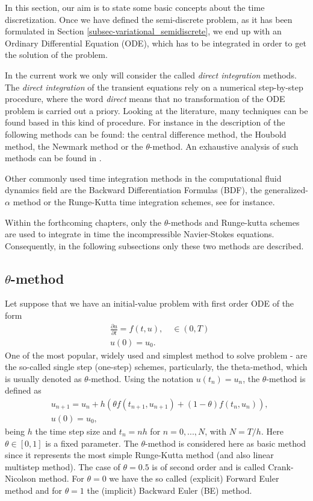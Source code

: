 In this section, our aim is to state some basic concepts about the time discretization. Once we have defined the semi-discrete problem, as it has been formulated in Section \ref{subsec-variational_semidiscrete}, we end up with an Ordinary Differential Equation (ODE), which has to be integrated in order to get the solution of the problem.

In the current work we only will consider the called \textit{direct integration} methods. The \textit{direct integration} of the transient equations rely on a numerical step-by-step procedure, where the word \textit{direct} means that no transformation of the ODE problem is carried out a priory. Looking at the literature, many techniques can be found based in this kind of procedure. For instance in \cite{bathe_finite_2006} the description of the following methods can be found: the central difference method, the Houbold method, the Newmark method or the $ \theta $-method. An exhaustive analysis of such methods can be found in \cite{belytschko_computational_1983}.

Other commonly used time integration methods in the computational fluid dynamics field are the Backward Differentiation Formulas (BDF), the generalized-$ \alpha $ method or the Runge-Kutta time integration schemes, see \cite{brayton_new_1972, jansen_generalized-alpha_2000, dettmer_analysis_2003,hairer_solving_2008} for instance.

Within the forthcoming chapters, only the $ \theta $-methods and Runge-kutta schemes are used to integrate in time the incompressible Navier-Stokes equations. Consequently, in the following subsections only these two methods are described. 

\subsection{$ \theta $-method}
Let suppose that we have an initial-value problem with first order ODE of the form
\begin{align}
\label{eq-C2_time_ODE}
&\frac{\partial u}{\partial t}=f(t,u),\quad\in(0,T)\\
\label{eq-C2_time_ODE_0}
&u(0)=u_0.
\end{align}
One of the most popular, widely used and simplest method to solve problem - are the so-called single step (one-step) schemes, particularly, the theta-method, which is usually denoted as $ \theta $-method. Using the notation $u(t_n) = u_n$, the $ \theta $-method is defined as
\begin{align*}
\label{eq-C2_time_theta_method}
&u_{n+1} = u_n + h (\theta f(t_{n+1}, u_{n+1}) + (1-\theta )f(t_n,u_n)),\\
&u(0) = u_0,
\end{align*}
being $ h $ the time step size and $ t_n = nh $ for $ n=0,...,N $, with $ N=T/h $. Here $ \theta \in [0, 1] $ is a fixed parameter. The $ \theta $-method is considered here as basic method since it represents the most simple Runge-Kutta method (and also linear multistep method). The case of $ \theta=0.5 $ is of second order and is called Crank-Nicolson method. For $ \theta=0 $ we have the so called (explicit) Forward Euler method and for $ \theta=1 $ the (implicit) Backward Euler (BE) method.

